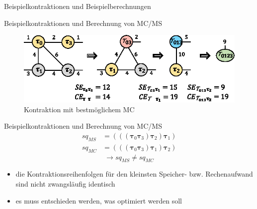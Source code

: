 \documentclass{beamer}
\begin{document}
\begin{section}{Beispielkontraktionen und Beispielberechnungen}
		\begin{frame}{Beispielkontraktionen und Berechnung von MC/MS}
			\begin{figure}
				\includegraphics{figure_03_d}
				\caption{Kontraktion mit bestmöglichem MC}
			\end{figure}
		\end{frame}

		\begin{frame}{Beispielkontraktionen und Berechnung von MC/MS}
			\begin{align*}
				sq_{MS} &= (((\bm{\tau}_{0} \bm{\tau}_{3}) \bm{\tau}_{2}) \bm{\tau}_{1}) \\
				sq_{MC} &= (((\bm{\tau}_{0} \bm{\tau}_{3}) \bm{\tau}_{1}) \bm{\tau}_{2})
			\end{align*}
			\begin{equation*}
				\rightarrow sq_{MS} \neq sq_{MC}
			\end{equation*}
			\begin{itemize}
				\item die Kontraktionsreihenfolgen für den kleinsten Speicher- bzw. Rechenaufwand sind nicht zwangsläufig identisch
				\item es muss entschieden werden, was optimiert werden soll
			\end{itemize}
		\end{frame}

	\end{section}
\end{document}
